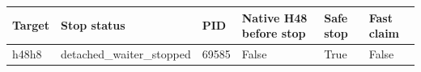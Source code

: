 {\small
\begin{tabular}{llllll}
\hline
Target & Stop status & PID & Native H48 before stop & Safe stop & Fast claim \\
\hline
h48h8 & detached\_waiter\_stopped & 69585 & False & True & False \\
\hline
\end{tabular}
}
